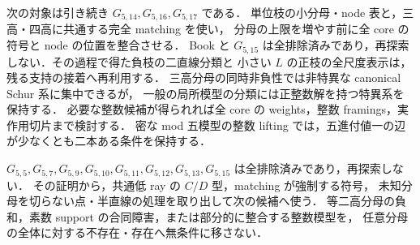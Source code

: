 次の対象は引き続き $G_{5,14},G_{5,16},G_{5,17}$ である．
単位枝の小分母・node 表と，三高・四高に共通する完全 matching を使い，
分母の上限を増やす前に全 core の符号と node の位置を整合させる．
Book と $G_{5,15}$ は全排除済みであり，再探索しない．その過程で得た負枝の二直線分類と
小さい $L$ の正枝の全尺度表示は，残る支持の接着へ再利用する．
三高分母の同時非負性では非特異な canonical Schur 系に集中できるが，
一般の局所模型の分類には正整数解を持つ特異系を保持する．
必要な整数候補が得られれば全 core の weights，整数 framings，実作用切片まで検討する．
密な mod 五模型の整数 lifting では，五進付値一の辺が少なくとも二本ある条件を保持する．

$G_{5,5},G_{5,7},G_{5,9},G_{5,10},G_{5,11},G_{5,12},G_{5,13},G_{5,15}$ は全排除済みであり，再探索しない．
その証明から，共通低 ray の $C/D$ 型，matching が強制する符号，
未知分母を切らない点・半直線の処理を取り出して次の候補へ使う．
等二高分母の負和，素数 support の合同障害，または部分的に整合する整数模型を，
任意分母の全体に対する不存在・存在へ無条件に移さない．
